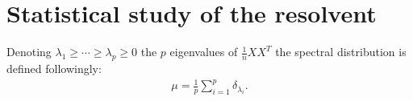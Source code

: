 \documentclass[a4papaer, titlepage]{book}
\begin{document}
\chapter{Statistical study of the resolvent}\label{cha:resolvente_lipschtiz}\label{cha:resolvent}
Denoting $\lambda_1\geq \cdots \geq \lambda_p\geq 0$ the $p$ eigenvalues of $\frac{1}{n}XX^T$ the spectral distribution is defined followingly:
\begin{align*}
  \mu = \frac{1}{p} \sum_{i=1}^p \delta_{\lambda_i}.
\end{align*}





\end{document}
